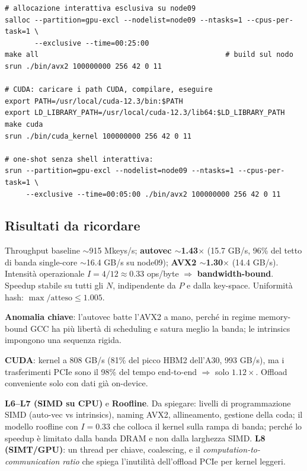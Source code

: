 \documentclass[11pt,a4paper]{article}
\begin{document}
\begin{lstlisting}[style=bash, caption={Sul cluster: M1 gira su node09 (AMD + GPU A30), partizione gpu-excl.}]
# allocazione interattiva esclusiva su node09
salloc --partition=gpu-excl --nodelist=node09 --ntasks=1 --cpus-per-task=1 \
       --exclusive --time=00:25:00
make all                                            # build sul nodo
srun ./bin/avx2 100000000 256 42 0 11

# CUDA: caricare i path CUDA, compilare, eseguire
export PATH=/usr/local/cuda-12.3/bin:$PATH
export LD_LIBRARY_PATH=/usr/local/cuda-12.3/lib64:$LD_LIBRARY_PATH
make cuda
srun ./bin/cuda_kernel 100000000 256 42 0 11

# one-shot senza shell interattiva:
srun --partition=gpu-excl --nodelist=node09 --ntasks=1 --cpus-per-task=1 \
     --exclusive --time=00:05:00 ./bin/avx2 100000000 256 42 0 11
\end{lstlisting}

\subsection{Risultati da ricordare}

Throughput baseline $\sim$915 Mkeys/s; \textbf{autovec $\sim$1.43$\times$} (15.7 GB/s, 96\% del tetto di banda single-core $\sim$16.4 GB/s su node09); \textbf{AVX2 $\sim$1.30$\times$} (14.4 GB/s). Intensità operazionale $I=4/12\approx 0.33$ ops/byte $\Rightarrow$ \textbf{bandwidth-bound}. Speedup stabile su tutti gli $N$, indipendente da $P$ e dalla key-space. Uniformità hash: $\max/\text{atteso}\le 1.005$.

\textbf{Anomalia chiave}: l'autovec batte l'AVX2 a mano, perché in regime memory-bound GCC ha più libertà di scheduling e satura meglio la banda; le intrinsics impongono una sequenza rigida.

\textbf{CUDA}: kernel a 808 GB/s (81\% del picco HBM2 dell'A30, 993 GB/s), ma i trasferimenti PCIe sono il 98\% del tempo end-to-end $\Rightarrow$ solo $1.12\times$. Offload conveniente solo con dati già on-device.

\begin{theorybox}
\textbf{L6--L7 (SIMD su CPU)} e \textbf{Roofline}. Da spiegare: livelli di programmazione SIMD (auto-vec vs intrinsics), naming AVX2, allineamento, gestione della coda; il modello roofline con $I=0.33$ che colloca il kernel sulla rampa di banda; perché lo speedup è limitato dalla banda DRAM e non dalla larghezza SIMD. \textbf{L8 (SIMT/GPU)}: un thread per chiave, coalescing, e il \emph{computation-to-communication ratio} che spiega l'inutilità dell'offload PCIe per kernel leggeri.
\end{theorybox}
\end{document}
